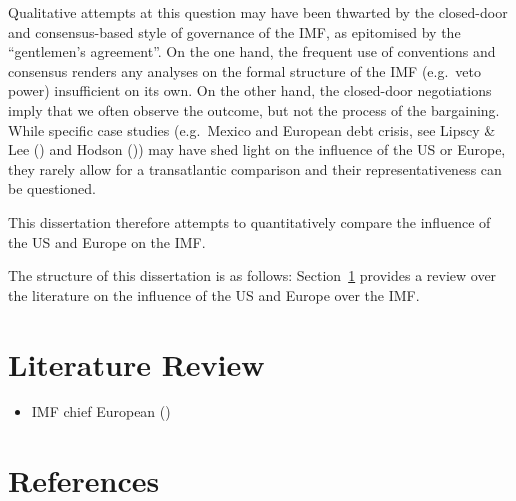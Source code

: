 \documentclass[
  letterpaper,
  abstract=true]{scrartcl}
\providecommand{\tightlist}{%
  \setlength{\itemsep}{0pt}\setlength{\parskip}{0pt}}\usepackage{longtable,booktabs,array}
\begin{document}
Qualitative attempts at this question may have been thwarted by the
closed-door and consensus-based style of governance of the IMF, as
epitomised by the ``gentlemen's agreement''. On the one hand, the
frequent use of conventions and consensus renders any analyses on the
formal structure of the IMF (e.g.~veto power) insufficient on its own.
On the other hand, the closed-door negotiations imply that we often
observe the outcome, but not the process of the bargaining. While
specific case studies (e.g.~Mexico and European debt crisis, see Lipscy
\& Lee () and Hodson
()) may have shed light on the influence
of the US or Europe, they rarely allow for a transatlantic comparison
and their representativeness can be questioned.

This dissertation therefore attempts to quantitatively compare the
influence of the US and Europe on the IMF.

The structure of this dissertation is as follows:
Section~\ref{sec-litreview} provides a review over the literature on the
influence of the US and Europe over the IMF.

\section{Literature Review}\label{sec-litreview}

\begin{itemize}
\tightlist
\item
  IMF chief European ()
\end{itemize}

\section*{References}\label{references}
\end{document}
